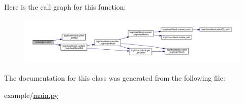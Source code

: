 Here is the call graph for this function\+:\nopagebreak
\begin{figure}[H]
\begin{center}
\leavevmode
\includegraphics[width=350pt]{classmain_1_1logout_a726ef779e6bf4da8974eae3209276922_cgraph}
\end{center}
\end{figure}




The documentation for this class was generated from the following file\+:\begin{DoxyCompactItemize}
\item 
example/\hyperlink{main_8py}{main.\+py}\end{DoxyCompactItemize}
